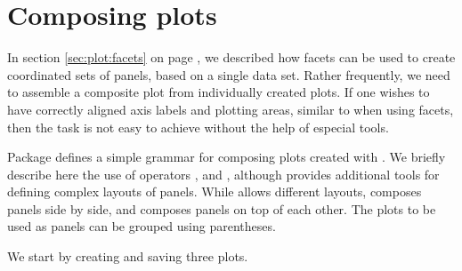 \documentclass[krantz2]{krantz}\usepackage{knitr}
\begin{document}
\section{Composing plots}
In section \ref{sec:plot:facets} on page \pageref{sec:plot:facets}, we described how facets can be used to create coordinated sets of panels, based on a single data set. Rather frequently, we need to assemble a composite plot from individually created plots. If one wishes to have correctly aligned axis labels and plotting areas, similar to when using facets, then the task is not easy to achieve without the help of especial tools.

Package  defines a simple grammar for composing plots created with \ggplot. We briefly describe here the use of operators \Roperator{+}, \Roperator{|} and \Roperator{/}, although  provides additional tools for defining complex layouts of panels. While \Roperator{+} allows different layouts, \Roperator{|} composes panels side by side, and \Roperator{/} composes panels on top of each other. The plots to be used as panels can be grouped using parentheses.

We start by creating and saving three plots.
\begin{knitrout}\footnotesize
{}\color{fgcolor}\begin{kframe}
\begin{alltt}
 \hlkwb{<-}    \hlstd{=}  \hlopt{+}
        \hlstd{()} \hlopt{+}
        \hlstd{(} \hlstd{=} \hlstd{)}
 \hlkwb{<-}    \hlstd{=}  \hlopt{+}
        \hlstd{()} \hlopt{+}
        \hlstd{(} \hlstd{=} \hlstd{)}
 \hlkwb{<-}  \hlstd{(} \hlopt{+}
        \hlstd{()} \hlopt{+}
        \hlstd{(} \hlstd{=}
                \hlstd{(} \hlstd{=} \hlstd{,}  \hlstd{=} \hlstd{,}  \hlstd{=} \hlstd{))}
\end{alltt}
\end{kframe}
\end{knitrout}
\end{document}
